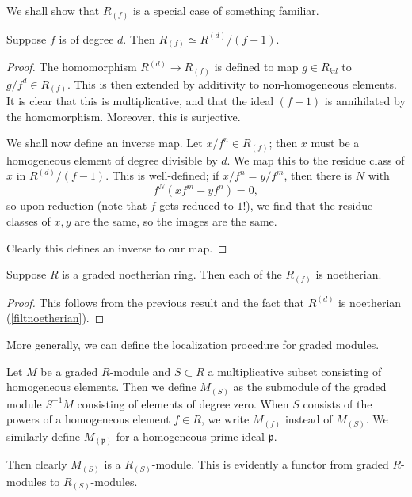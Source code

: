 We shall show that $R_{(f)}$ is a special case of something familiar.

\begin{proposition} \label{loc interpret as quotient ring}
Suppose $f$ is of degree $d$. Then $R_{(f)} \simeq R^{(d)}/(f-1)$.
\end{proposition} 
\begin{proof} 
The homomorphism $R^{(d)} \to R_{(f)}$ is defined to map $g \in R_{kd}$ to $g/f^d \in
R_{(f)}$.  This is then extended by additivity to non-homogeneous elements. It
is clear that this is multiplicative, and that the ideal $(f-1)$ is annihilated
by the homomorphism.
Moreover, this is surjective.

We shall now define an inverse map. Let $x/f^n \in R_{(f)}$; then $x$ must be
a homogeneous element of degree divisible by $d$. We map this to
the residue class of $x$ in $R^{(d)}/(f-1)$.  This is well-defined; if $x/f^n =
y/f^m$, then there is $N$ with
\[ f^N( xf^m - yf^n) = 0,  \]
so upon reduction (note that $f$ gets reduced to $1$!), we find that the
residue classes of $x,y$ are the same, so the images are the same.

Clearly this defines an inverse to our map.
\end{proof} 

\begin{corollary} 
Suppose $R$ is a graded noetherian ring. Then each of the $R_{(f)}$ is
noetherian.
\end{corollary} 
\begin{proof} 
This follows from the previous result and the fact that $R^{(d)}$ is noetherian
(\cref{filtnoetherian}).\end{proof} 

More generally, we can define the localization procedure for graded modules.
\begin{definition} 
Let $M$ be a graded $R$-module and $S \subset R$ a multiplicative subset
consisting of homogeneous elements. Then we define $M_{(S)}$ as the submodule
of the graded module $S^{-1}M$ consisting of elements of degree zero. When $S$
consists of the powers of a homogeneous element $f \in R$, we write $M_{(f)}$
instead of $M_{(S)}$. We similarly define $M_{(\mathfrak{p})}$ for a
homogeneous prime ideal $\mathfrak{p}$.
\end{definition} 

Then clearly $M_{(S)}$ is a $R_{(S)}$-module. This is evidently a functor from
graded $R$-modules to $R_{(S)}$-modules.

